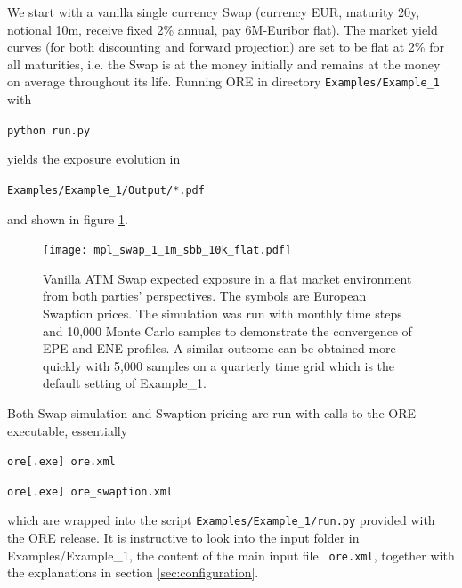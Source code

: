 \documentclass[12pt, a4paper]{article}
\begin{document}
We start with a vanilla single currency Swap (currency EUR, maturity 20y, notional 10m, receive fixed 2\% annual, pay
6M-Euribor flat). The market yield curves (for both discounting and forward projection) are set to be flat at 2\% for
all maturities, i.e. the Swap is at the money initially and remains at the money on average throughout its life. Running
ORE in directory {\tt Examples/Example\_1} with

\medskip
\centerline{\tt python run.py } 
\medskip

yields the exposure evolution in 

\medskip
\centerline{\tt Examples/Example\_1/Output/*.pdf } 
\medskip

and shown in figure \ref{fig_1}. 
\begin{figure}[h!]
\begin{center}
\texttt{[image: mpl\_swap\_1\_1m\_sbb\_10k\_flat.pdf]}
\end{center}
\caption{Vanilla ATM Swap expected exposure in a flat market environment from both parties' perspectives. The symbols are European Swaption prices. The simulation was run with monthly time steps and 10,000 Monte Carlo samples to demonstrate the convergence of EPE and ENE profiles. A similar
outcome can be obtained more quickly with 5,000 samples on a quarterly time grid which is the default setting of Example\_1. }
\label{fig_1}
\end{figure}
Both Swap simulation and Swaption pricing are run with calls to the ORE executable, essentially 

\medskip
\centerline{\tt ore[.exe] ore.xml} 

\centerline{\tt ore[.exe] ore\_swaption.xml} 
\medskip

which are wrapped into the script {\tt Examples/Example\_1/run.py} provided with the ORE release.
It is instructive to look into the input folder in Examples/Example\_1, the content of the main input file {\tt
  ore.xml}, together with the explanations in section \ref{sec:configuration}. \\
\end{document}
